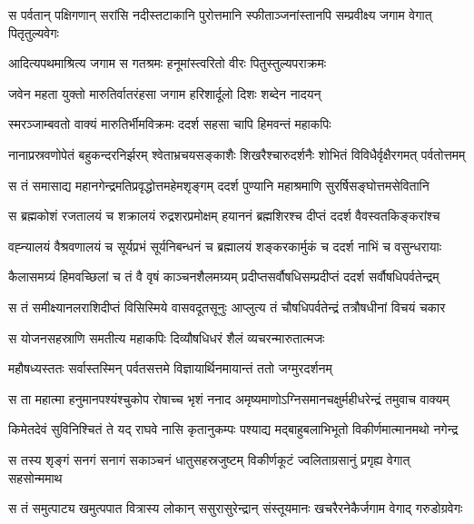 \twolineshloka
{स पर्वतान् पक्षिगणान् सरांसि नदीस्तटाकानि पुरोत्तमानि}
{स्फीताञ्जनांस्तानपि सम्प्रवीक्ष्य जगाम वेगात् पितृतुल्यवेगः} %

\twolineshloka
{आदित्यपथमाश्रित्य जगाम स गतश्रमः}
{हनूमांस्त्वरितो वीरः पितुस्तुल्यपराक्रमः} %

\twolineshloka
{जवेन महता युक्तो मारुतिर्वातरंहसा}
{जगाम हरिशार्दूलो दिशः शब्देन नादयन्} %

\twolineshloka
{स्मरञ्जाम्बवतो वाक्यं मारुतिर्भीमविक्रमः}
{ददर्श सहसा चापि हिमवन्तं महाकपिः} %

\threelineshloka
{नानाप्रस्रवणोपेतं बहुकन्दरनिर्झरम्}
{श्वेताभ्रचयसङ्काशैः शिखरैश्चारुदर्शनैः}
{शोभितं विविधैर्वृक्षैरगमत् पर्वतोत्तमम्} %

\twolineshloka
{स तं समासाद्य महानगेन्द्रमतिप्रवृद्धोत्तमहेमशृङ्गम्}
{ददर्श पुण्यानि महाश्रमाणि सुरर्षिसङ्घोत्तमसेवितानि} %

\twolineshloka
{स ब्रह्मकोशं रजतालयं च शक्रालयं रुद्रशरप्रमोक्षम्}
{हयाननं ब्रह्मशिरश्च दीप्तं ददर्श वैवस्वतकिङ्करांश्च} %

\twolineshloka
{वह्न्यालयं वैश्रवणालयं च सूर्यप्रभं सूर्यनिबन्धनं च}
{ब्रह्मालयं शङ्करकार्मुकं च ददर्श नाभिं च वसुन्धरायाः} %

\twolineshloka
{कैलासमग्र्यं हिमवच्छिलां च तं वै वृषं काञ्चनशैलमग्र्यम्}
{प्रदीप्तसर्वौषधिसम्प्रदीप्तं ददर्श सर्वौषधिपर्वतेन्द्रम्} %

\twolineshloka
{स तं समीक्ष्यानलराशिदीप्तं विसिस्मिये वासवदूतसूनुः}
{आप्लुत्य तं चौषधिपर्वतेन्द्रं तत्रौषधीनां विचयं चकार} %

\twolineshloka
{स योजनसहस्राणि समतीत्य महाकपिः}
{दिव्यौषधिधरं शैलं व्यचरन्मारुतात्मजः} %

\twolineshloka
{महौषध्यस्ततः सर्वास्तस्मिन् पर्वतसत्तमे}
{विज्ञायार्थिनमायान्तं ततो जग्मुरदर्शनम्} %

\twolineshloka
{स ता महात्मा हनुमानपश्यंश्चुकोप रोषाच्च भृशं ननाद}
{अमृष्यमाणोऽग्निसमानचक्षुर्महीधरेन्द्रं तमुवाच वाक्यम्} %

\twolineshloka
{किमेतदेवं सुविनिश्चितं ते यद् राघवे नासि कृतानुकम्पः}
{पश्याद्य मद्बाहुबलाभिभूतो विकीर्णमात्मानमथो नगेन्द्र} %

\twolineshloka
{स तस्य शृङ्गं सनगं सनागं सकाञ्चनं धातुसहस्रजुष्टम्}
{विकीर्णकूटं ज्वलिताग्रसानुं प्रगृह्य वेगात् सहसोन्ममाथ} %

\twolineshloka
{स तं समुत्पाट्य खमुत्पपात वित्रास्य लोकान् ससुरासुरेन्द्रान्}
{संस्तूयमानः खचरैरनेकैर्जगाम वेगाद् गरुडोग्रवेगः} %

